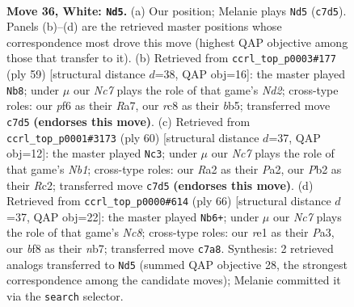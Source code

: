 \documentclass[11pt]{article}
\begin{document}
\clearpage

\begin{figure}[p]\centering
\begin{subfigure}{0.46\textwidth}\centering
\resizebox{\linewidth}{!}{%
\newchessgame
\chessboard[
  setfen={2r2b2/ppN4k/5pp1/7p/P7/6P1/RPP2PKP/4r3 w - - 3 36},
  showmover=false,
  pgfstyle=straightmove, color=movearrow, markmove={c7-d5}
]}
\caption{}
\end{subfigure}\hfill
\begin{subfigure}{0.46\textwidth}\centering
\resizebox{\linewidth}{!}{%
\newchessgame
\chessboard[
  setfen={6k1/r2n1ppp/4p3/1B6/1b1PP3/2p3P1/5P1P/2R1N1K1 b - - 3 30},
  showmover=false,
  pgfstyle=straightmove, color=movearrow, markmove={d7-b8}
]}
\caption{}
\end{subfigure}
\\[4pt]
\begin{subfigure}{0.46\textwidth}\centering
\resizebox{\linewidth}{!}{%
\newchessgame
\chessboard[
  setfen={4Nbk1/p7/1np3pp/8/5P2/6P1/P1R3KP/1N1r4 w - - 0 31},
  showmover=false,
  pgfstyle=straightmove, color=movearrow, markmove={b1-c3}
]}
\caption{}
\end{subfigure}\hfill
\begin{subfigure}{0.46\textwidth}\centering
\resizebox{\linewidth}{!}{%
\newchessgame
\chessboard[
  setfen={1rN5/1n1k2p1/4pp2/p6p/7P/P7/1PR2PP1/5K2 w - - 6 34},
  showmover=false,
  pgfstyle=straightmove, color=movearrow, markmove={c8-b6}
]}
\caption{}
\end{subfigure}
\caption{\textbf{Move 36, White: \texttt{Nd5}.} (a) Our position; Melanie plays \texttt{Nd5} (\texttt{c7d5}). Panels (b)--(d) are the retrieved master positions whose correspondence most drove this move (highest QAP objective among those that transfer to it). (b) Retrieved from \texttt{ccrl\_top\_p0003\#177} (ply 59) [structural distance $d$=38, QAP obj=16]: the master played \texttt{Nb8}; under $\mu$ our \emph{Nc7} plays the role of that game's \emph{Nd2}; cross-type roles: our \emph{p}f6 as their \emph{R}a7, our \emph{r}c8 as their \emph{b}b5; transferred move \texttt{c7d5} \textbf{(endorses this move)}. (c) Retrieved from \texttt{ccrl\_top\_p0001\#3173} (ply 60) [structural distance $d$=37, QAP obj=12]: the master played \texttt{Nc3}; under $\mu$ our \emph{Nc7} plays the role of that game's \emph{Nb1}; cross-type roles: our \emph{R}a2 as their \emph{P}a2, our \emph{P}b2 as their \emph{R}c2; transferred move \texttt{c7d5} \textbf{(endorses this move)}. (d) Retrieved from \texttt{ccrl\_top\_p0000\#614} (ply 66) [structural distance $d$=37, QAP obj=22]: the master played \texttt{Nb6+}; under $\mu$ our \emph{Nc7} plays the role of that game's \emph{Nc8}; cross-type roles: our \emph{r}e1 as their \emph{P}a3, our \emph{b}f8 as their \emph{n}b7; transferred move \texttt{c7a8}. Synthesis: 2 retrieved analogs transferred to \texttt{Nd5} (summed QAP objective 28, the strongest correspondence among the candidate moves); Melanie committed it via the \texttt{search} selector.}
\label{fig:thought-m70}
\end{figure}
\end{document}
